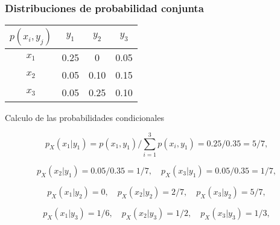 \documentclass[spanish]{beamer}
\begin{document}
\begin{frame}
\frametitle{Distribuciones de probabilidad conjunta}

\begin{center}
\begin{tabular}{ c c c c } 
\hline
$p(x_{i},y_{j})$ & $y_{1}$ & $y_{2}$ & $y_{3}$\\
 \hline
 $x_{1}$ & 0.25 & 0  & 0.05\\ 
 $x_{2}$ & 0.05 & 0.10 & 0.15\\ 
 $x_{3}$ & 0.05 & 0.25 & 0.10\\ 
 \hline
\end{tabular}
\end{center}
Calculo de las probabilidades condicionales

\begin{equation*}
p_{X} (x_{1} |y_{1}) = p(x_{1}, y_{1})/ \sum_{i=1}^3 p(x_{i}, y_{1}) = 0.25/0.35 = 5/7,
\end{equation*}

\begin{equation*} 
p_{X} (x_{2} |y_{1}) = 0.05/0.35 = 1/7, \quad  p_{X} (x_{3} |y_{1}) = 0.05/0.35 = 1/7,
\end{equation*}

\begin{equation*}
p_{X} (x_{1} |y_{2}) = 0, \quad  p_{X} (x_{2} |y_{2}) = 2/7, \quad  p_{X} (x_{3} |y_{2}) = 5/7,
\end{equation*}

\begin{equation*}
p_{X} (x_{1} |y_{3}) = 1/6, \quad  p_{X} (x_{2} |y_{3}) = 1/2, \quad  p_{X} (x_{3} |y_{3}) = 1/3,
\end{equation*}
\end{frame}
\end{document}
